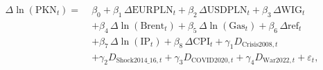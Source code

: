 \documentclass[12pt, twoside]{article}
\begin{document}
\begin{equation}
\begin{split}
\Delta \ln(\text{PKN}_{t}) =\;& \beta_{0}
+ \beta_{1}\,\Delta \text{EURPLN}_{t}
+ \beta_{2}\,\Delta \text{USDPLN}_{t}
+ \beta_{3}\,\Delta \text{WIG}_{t}\\
&+ \beta_{4}\,\Delta \ln(\text{Brent}_{t})
+ \beta_{5}\,\Delta \ln(\text{Gas}_{t})
+ \beta_{6}\,\Delta \text{ref}_{t}\\
&+ \beta_{7}\,\Delta \ln(\text{IP}_{t})
+ \beta_{8}\,\Delta \text{CPI}_{t}
+ \gamma_{1}D_{\text{Crisis2008},t}\\
&+ \gamma_{2}D_{\text{Shock2014\_16},t}
+ \gamma_{3}D_{\text{COVID2020},t}
+ \gamma_{4}D_{\text{War2022},t}
+ \varepsilon_{t},
\end{split}
\label{eq:full_model}
\end{equation}
\end{document}
